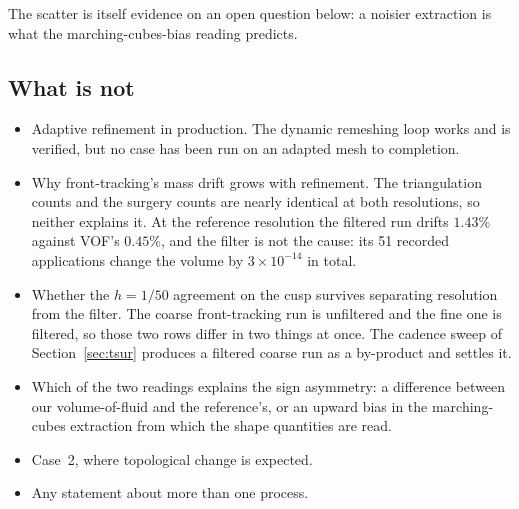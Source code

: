 The scatter is itself evidence on an open question below: a noisier extraction is
what the marching-cubes-bias reading predicts.

\subsection*{What is not}

\begin{itemize}
\item Adaptive refinement in production. The dynamic remeshing loop works and
is verified, but no case has been run on an adapted mesh to completion.
\item Why front-tracking's mass drift grows with refinement. The triangulation
counts and the surgery counts are nearly identical at both resolutions, so
neither explains it. At the reference resolution the filtered run drifts
$1.43\%$ against VOF's $0.45\%$, and the filter is not the cause: its 51
recorded applications change the volume by $3\times10^{-14}$ in total.
\item Whether the $h=1/50$ agreement on the cusp survives separating resolution
from the filter. The coarse front-tracking run is unfiltered and the fine one is
filtered, so those two rows differ in two things at once. The cadence sweep of
Section~\ref{sec:tsur} produces a filtered coarse run as a by-product and
settles it.
\item Which of the two readings explains the sign asymmetry: a difference
between our volume-of-fluid and the reference's, or an upward bias in the
marching-cubes extraction from which the shape quantities are read.
\item Case~2, where topological change is expected.
\item Any statement about more than one process.
\end{itemize}
